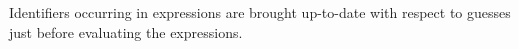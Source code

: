 \documentclass[preprint,natbib]{sigplanconf}
\newcommand\Statement{c}
\newcommand\SchemeName{s}
\begin{document}
\begin{itemize}
    \end{itemize}
    Identifiers occurring in expressions are brought up-to-date with respect to guesses just before evaluating the expressions.
\end{document}

